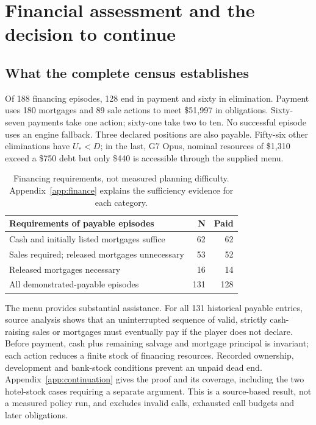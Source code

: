 \section{Financial assessment and the decision to continue}
\label{sec:execution}
\subsection{What the complete census establishes}
Of 188 financing episodes, 128 end in payment and sixty in elimination. Payment uses 180 mortgages and 89 sale actions to meet \$51,997 in obligations. Sixty-seven payments take one action; sixty-one take two to ten. No successful episode uses an engine fallback. Three declared positions are also payable. Fifty-six other eliminations have $U_*<D$; in the last, G7 Opus, nominal resources of \$1,310 exceed a \$750 debt but only \$440 is accessible through the supplied menu.

\begin{table}[t]\centering\small
\begin{tabularx}{\linewidth}{@{}Yrr@{}}\toprule
Requirements of payable episodes & N & Paid\\\midrule
Cash and initially listed mortgages suffice &62&62\\
Sales required; released mortgages unnecessary &53&52\\
Released mortgages necessary &16&14\\\midrule
All demonstrated-payable episodes &131&128\\\bottomrule
\end{tabularx}
\caption{Financing requirements, not measured planning difficulty. Appendix~\ref{app:finance} explains the sufficiency evidence for each category.}\label{tab:debt-requirements}
\end{table}

The menu provides substantial assistance. For all 131 historical payable entries, source analysis shows that an uninterrupted sequence of valid, strictly cash-raising sales or mortgages must eventually pay if the player does not declare. Before payment, cash plus remaining salvage and mortgage principal is invariant; each action reduces a finite stock of financing resources. Recorded ownership, development and bank-stock conditions prevent an unpaid dead end. Appendix~\ref{app:continuation} gives the proof and its coverage, including the two hotel-stock cases requiring a separate argument. This is a source-based result, not a measured policy run, and excludes invalid calls, exhausted call budgets and later obligations.

